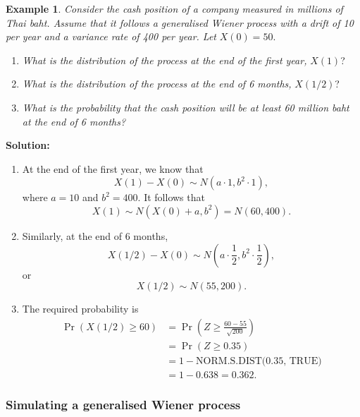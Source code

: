 \documentclass[
]{book}
\theoremstyle{definition}
\theoremstyle{definition}
\newtheorem{example}{Example}[chapter]
\theoremstyle{definition}
\theoremstyle{definition}
\theoremstyle{remark}
\begin{document}
\begin{example}

\emph{Consider the cash position of a company measured in millions of Thai
baht. Assume that it follows a generalised Wiener process with a drift
of 10 per year and a variance rate of 400 per year. Let} \(X(0) = 50\).

\begin{enumerate}
\def\labelenumi{\arabic{enumi}.}
\item
  \emph{What is the distribution of the process at the end of the first
  year,} \(X(1)\)?
\item
  \emph{What is the distribution of the process at the end of 6 months,}
  \(X(1/2)\)?
\item
  \emph{What is the probability that the cash position will be at least 60
  million baht at the end of 6 months?}
\end{enumerate}

\end{example}

\textbf{Solution:}

\begin{enumerate}
\def\labelenumi{\arabic{enumi}.}
\item
  At the end of the first year, we know that
  \[X(1) - X(0) \sim N(a \cdot 1, b^2 \cdot 1),\] where \(a = 10\) and
  \(b^2 = 400\). It follows that
  \[X(1) \sim N(X(0) + a , b^2 ) = N(60, 400).\]
\item
  Similarly, at the end of 6 months,
  \[X(1/2) - X(0) \sim N(a \cdot \frac{1}{2}, b^2 \cdot \frac{1}{2}),\]
  or \[X(1/2) \sim N(55,200).\]
\item
  The required probability is \[\begin{aligned}
          \Pr( X(1/2) \ge 60) &= \Pr( Z \ge \frac{60 - 55}{\sqrt{200}}  )\\
          &= \Pr(Z \ge 0.35) \\
          &= 1 - \text{NORM.S.DIST(0.35, TRUE)} \\
          &= 1 - 0.638 = 0.362.
      \end{aligned}\]
\end{enumerate}

\hypertarget{simulating-a-generalised-wiener-process}{%
\subsubsection{Simulating a generalised Wiener process}\label{simulating-a-generalised-wiener-process}}
\end{document}
